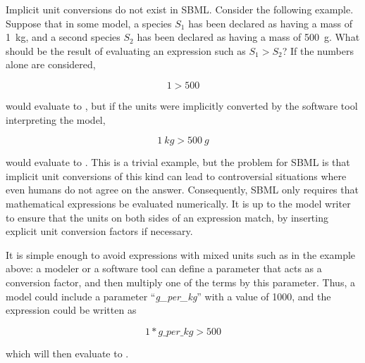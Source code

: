 Implicit unit conversions do not exist in SBML.  Consider the
following example.  Suppose that in some model, a species $S_1$
has been declared as having a mass of 1~kg, and a second species
$S_2$ has been declared as having a mass of 500~g.  What should be
the result of evaluating an expression such as $S_1 > S_2$?  If
the numbers alone are considered,
\begin{linenomath}
  \begin{equation*}
    1 > 500
  \end{equation*}
\end{linenomath}
would evaluate to , but if the units were implicitly
converted by the software tool interpreting the model,
\begin{linenomath}
  \begin{equation*}
    1~kg > 500~g
  \end{equation*}
\end{linenomath}
would evaluate to .  This is a trivial example, but the
problem for SBML is that implicit unit conversions of this kind
can lead to controversial situations where even humans do not
agree on the answer.  Consequently, SBML only requires that
mathematical expressions be evaluated numerically.  It is up to
the model writer to ensure that the units on both sides of an
expression match, by inserting explicit unit conversion factors if
necessary.

It is simple enough to avoid expressions with mixed units such as
in the example above: a modeler or a software tool can define a
parameter that acts as a conversion factor, and then multiply one
of the terms by this parameter.  Thus, a model could include a
parameter ``\emph{g\_per\_kg}'' with a value of 1000, and the
expression could be written as
\begin{linenomath}
  \begin{equation*}
    1 * g\_per\_kg > 500
  \end{equation*}
\end{linenomath}
which will then evaluate to .





